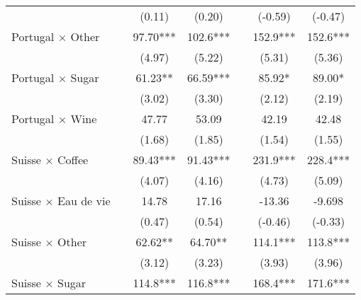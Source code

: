 {\begin{tabular}{l*{6}{c}}
                    &                     &      (0.11)         &      (0.20)         &                     &     (-0.59)         &     (-0.47)         \\
[1em]
Portugal $\times$ Other&                     &       97.70***&       102.6***&                     &       152.9***&       152.6***\\
                    &                     &      (4.97)         &      (5.22)         &                     &      (5.31)         &      (5.36)         \\
[1em]
Portugal $\times$ Sugar&                     &       61.23** &       66.59***&                     &       85.92*  &       89.00*  \\
                    &                     &      (3.02)         &      (3.30)         &                     &      (2.12)         &      (2.19)         \\
[1em]
Portugal $\times$ Wine&                     &       47.77         &       53.09         &                     &       42.19         &       42.48         \\
                    &                     &      (1.68)         &      (1.85)         &                     &      (1.54)         &      (1.55)         \\
[1em]
Suisse $\times$ Coffee&                     &       89.43***&       91.43***&                     &       231.9***&       228.4***\\
                    &                     &      (4.07)         &      (4.16)         &                     &      (4.73)         &      (5.09)         \\
[1em]
Suisse $\times$ Eau de vie&                     &       14.78         &       17.16         &                     &      -13.36         &      -9.698         \\
                    &                     &      (0.47)         &      (0.54)         &                     &     (-0.46)         &     (-0.33)         \\
[1em]
Suisse $\times$ Other&                     &       62.62** &       64.70** &                     &       114.1***&       113.8***\\
                    &                     &      (3.12)         &      (3.23)         &                     &      (3.93)         &      (3.96)         \\
[1em]
Suisse $\times$ Sugar&                     &       114.8***&       116.8***&                     &       168.4***&       171.6***\\

\end{tabular}}
